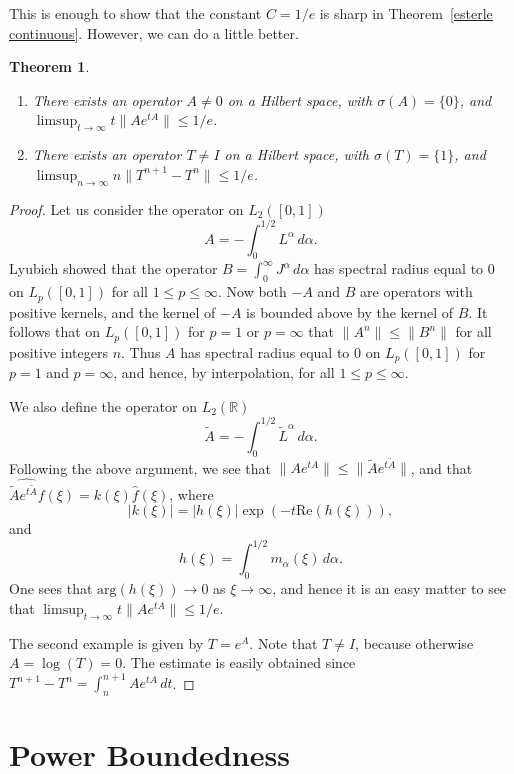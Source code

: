 \documentclass[12pt]{amsart}
\newtheorem{thm}{Theorem}[section]
\newcommand{\R}{{\mathbb R}}
\newcommand{\modo}[1]{{\left|#1\right|}}
\newcommand{\snormo}[1]{{\mathopen\|#1\mathclose\|}}
\begin{document}
This is enough to show that the constant $C = 1/e$ is sharp in
Theorem~\ref{esterle continuous}.  However, we can do a little better.

\begin{thm}
\label{esterle eg}
\begin{enumerate}
\item
There exists an operator $A \ne 0$ on a Hilbert space, with $\sigma(A)=\{0\}$,
and $\limsup_{t\to\infty} t \snormo{A e^{tA}} \le 1/e$.
\item
There exists an operator $T \ne I$ on a Hilbert space, with $\sigma(T)=\{1\}$,
and $\limsup_{n\to\infty} n \snormo{T^{n+1}-T^n} \le 1/e$.
\end{enumerate}
\end{thm}

\begin{proof}
Let us consider the operator on $L_2([0,1])$
$$ A = -\int_0^{1/2} L^\alpha \, d\alpha .$$
Lyubich \cite{lyubich2} showed that the operator
$B = \int_0^\infty J^\alpha \, d\alpha$ has spectral radius equal to $0$
on $L_p([0,1])$ for all $1 \le p \le \infty$.
Now both $-A$ and $B$ are operators with positive kernels, and the kernel
of $-A$ is bounded above by the kernel of $B$.  It follows that on
$L_p([0,1])$ for $p = 1$ or $p = \infty$ that
$\snormo{A^n} \le \snormo{B^n}$ for all positive integers $n$.
Thus $A$ has spectral radius equal to $0$ on $L_p([0,1])$ for $p=1$ and
$p=\infty$, and hence, by interpolation, for all $1 \le p \le \infty$.

We also define the operator on $L_2(\R)$
$$ \tilde A = -\int_0^{1/2} \tilde L^\alpha \, d\alpha .$$
Following the above argument,
we see that $\snormo{A e^{tA}} \le \snormo{\tilde A e^{t \tilde A}}$, and
that $\widehat{\tilde A e^{t\tilde A}f}(\xi) = k(\xi) \hat f(\xi)$, where
$$ \modo{k(\xi)} =
   \modo{h(\xi)}
   \exp(- t \text{Re}(h(\xi))) ,$$
and
$$ h(\xi) = \int_0^{1/2} m_\alpha(\xi) \, d\alpha .$$
One sees that $\text{arg}(h(\xi)) \to 0$ as $\xi\to\infty$,
and hence it is an easy matter to see that
$\limsup_{t\to\infty} t\snormo{A e^{tA}} \le 1/e$.

The second example is given by $T = e^A$.
Note that $T \ne I$, because otherwise $A = \log(T) = 0$.
The estimate is easily obtained
since $T^{n+1}-T^n = \int_n^{n+1} A e^{tA} \, dt$.
\end{proof}

\section{Power Boundedness}
\end{document}

